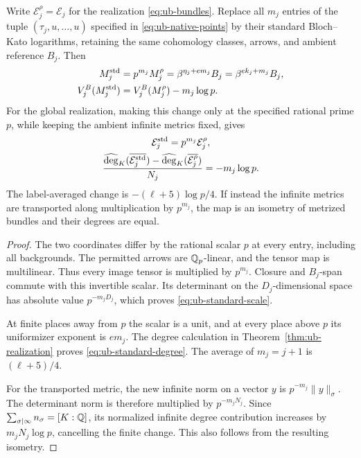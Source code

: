 \begin{proposition}\label{prop:ub-standard-scale}
Write $\mathcal E_j^\rho=\mathcal E_j$ for the realization
\eqref{eq:ub-bundles}. Replace all $m_j$ entries of the tuple
$(\tau_j,u,\ldots,u)$ specified in \eqref{eq:ub-native-points} by their
standard Bloch--Kato logarithms, retaining the same cohomology
classes, arrows, and ambient reference $B_j$. Then
\begin{equation}\label{eq:ub-standard-scale}
 \begin{aligned}
 M_j^{\rm std}&=p^{m_j}M_j^\rho
       =\beta^{\eta_j+em_j}B_j=\beta^{e k_j+m_j}B_j,\\
 V_j^B(M_j^{\rm std})&=V_j^B(M_j^\rho)-m_j\log p.
 \end{aligned}
\end{equation}
For the global realization, making this change only at the
specified rational prime $p$, while keeping the ambient infinite
metrics fixed, gives
\begin{equation}\label{eq:ub-standard-degree}
 \begin{gathered}
 \mathcal E_j^{\rm std}=p^{m_j}\mathcal E_j^\rho,\\
 \frac{\widehat{\deg}_K(\overline{\mathcal E_j^{\rm std}})
       -\widehat{\deg}_K(\overline{\mathcal E_j^\rho})}{N_j}
       =-m_j\log p.
 \end{gathered}
\end{equation}
The label-averaged change is $-(\ell+5)\log p/4$.
If instead the infinite metrics are transported along
multiplication by $p^{m_j}$, the map is an isometry of metrized
bundles and their degrees are equal.
\end{proposition}

\begin{proof}
The two coordinates differ by the rational scalar $p$ at every
entry, including all backgrounds. The permitted arrows are
$\mathbb Q_p$-linear, and the tensor map is multilinear. Thus every image
tensor is multiplied by $p^{m_j}$. Closure and $B_j$-span commute
with this invertible scalar. Its determinant on the
$D_j$-dimensional space has absolute value $p^{-m_jD_j}$,
which proves \eqref{eq:ub-standard-scale}.

At finite places away from $p$ the scalar is a unit, and at every
place above $p$ its uniformizer exponent is $em_j$. The degree
calculation in Theorem~\ref{thm:ub-realization} proves
\eqref{eq:ub-standard-degree}. The average of $m_j=j+1$ is
$(\ell+5)/4$.

For the transported metric, the new infinite norm on a vector $y$
is $p^{-m_j}\|y\|_\sigma$. The determinant norm is therefore
multiplied by $p^{-m_jN_j}$. Since
$\sum_{\sigma\mid\infty}n_\sigma=[K:\mathbb Q]$, its normalized infinite
degree contribution increases by $m_jN_j\log p$, cancelling the
finite change. This also follows from the resulting isometry.
\end{proof}

